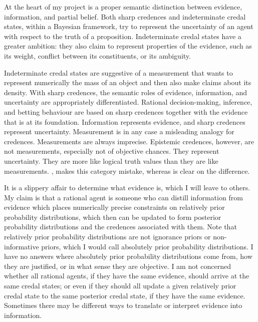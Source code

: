 \documentclass[11pt]{article}
\begin{document}
At the heart of my project is a proper semantic distinction between
evidence, information, and partial belief. Both sharp credences and
indeterminate credal states, within a Bayesian framework, try to
represent the uncertainty of an agent with respect to the truth of a
proposition. Indeterminate credal states have a greater ambition: they
also claim to represent properties of the evidence, such as its
weight, conflict between its constituents, or its ambiguity. 

Indeterminate credal states are suggestive of a measurement that wants
to represent numerically the mass of an object and then also make
claims about its density. With sharp credences, the semantic roles of
evidence, information, and uncertainty are appropriately
differentiated. Rational decision-making, inference, and betting
behaviour are based on sharp credences together with the evidence that
is at its foundation. Information represents evidence, and sharp
credences represent uncertainty. Measurement is in any case a
misleading analogy for credences. Measurements are always imprecise.
Epistemic credences, however, are not measurements, especially not of
objective chances. They represent uncertainty. They are more like
logical truth values than they are like measurements.
, makes this category mistake, whereas
 is clear on the difference.

It is a slippery affair to determine what evidence is, which I will
leave to others. My claim is that a rational agent is someone who can
distill information from evidence which places numerically precise
constraints on relatively prior probability distributions, which then
can be updated to form posterior probability distributions and the
credences associated with them. Note that relatively prior probability
distributions are not ignorance priors or non-informative priors,
which I would call absolutely prior probability distributions. I have
no answers where absolutely prior probability distributions come from,
how they are justified, or in what sense they are objective. I am not
concerned whether all rational agents, if they have the same evidence,
should arrive at the same credal states; or even if they should all
update a given relatively prior credal state to the same posterior
credal state, if they have the same evidence. Sometimes there may be
different ways to translate or interpret evidence into information.
\end{document}
